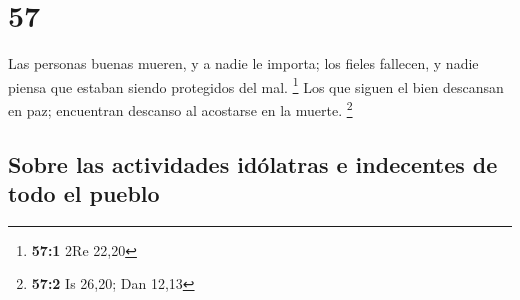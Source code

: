 \hypertarget{section-56}{%
\section{57}\label{section-56}}

 Las personas buenas mueren, y a nadie le importa; los
fieles fallecen, y nadie piensa que estaban siendo protegidos del mal.
\footnote{\textbf{57:1} 2Re 22,20}  Los que siguen el bien
descansan en paz; encuentran descanso al acostarse en la muerte.
\footnote{\textbf{57:2} Is 26,20; Dan 12,13}

\hypertarget{sobre-las-actividades-iduxf3latras-e-indecentes-de-todo-el-pueblo}{%
\subsection{Sobre las actividades idólatras e indecentes de todo el
pueblo}\label{sobre-las-actividades-iduxf3latras-e-indecentes-de-todo-el-pueblo}}

